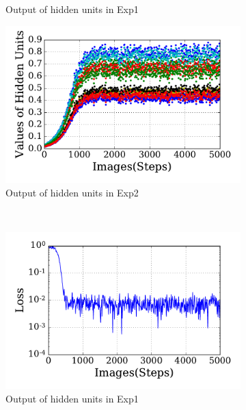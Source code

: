 \begin{figure}
\begin{subfigure}[t]{0.48\textwidth}
		\caption{Output of hidden units in Exp1}
	\end{subfigure}
	\begin{subfigure}[t]{0.48\textwidth}
		\includegraphics[width=\textwidth]{pics_sdlm/21_exp_AE_noise/exp2_hid_s.pdf}
		\caption{Output of hidden units in Exp2}
	\end{subfigure}\\
	\begin{subfigure}[t]{0.48\textwidth}
		\includegraphics[width=\textwidth]{pics_sdlm/21_exp_AE_noise/exp1_loss_s.pdf}
		\caption{Output of hidden units in Exp1}
	\end{subfigure}
	\begin{subfigure}[t]{0.48\textwidth}

\end{subfigure}
\end{figure}
